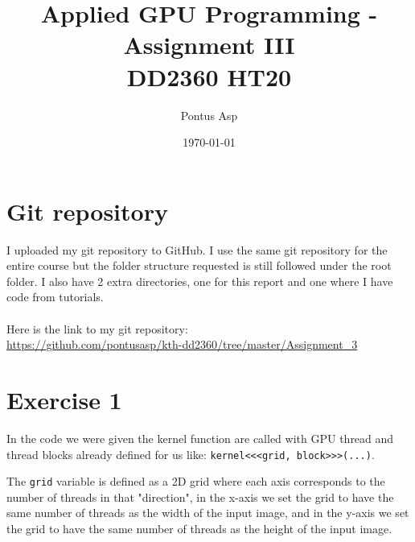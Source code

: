 \documentclass[a4paper, 12pt]{article}
\def\code#1{\texttt{#1}}
\begin{document}
\title{\vspace{4.0cm}Applied GPU Programming - Assignment III\\
\large DD2360 HT20}
\author{Pontus Asp}
\date{\today}
\maketitle
\thispagestyle{empty}
\newpage

\clearpage
{}

\section{Git repository}
I uploaded my git repository to GitHub. I use the same git repository for the entire course but the folder structure requested is still followed under the root folder. I also have 2 extra directories, one for this report and one where I have code from tutorials.
\\\\
Here is the link to my git repository:\\
\url{https://github.com/pontusasp/kth-dd2360/tree/master/Assignment_3}





\section{Exercise 1}
In the code we were given the kernel function are called with GPU thread and thread blocks already defined for us like: \code{kernel<<<grid, block>>>(...)}. 

The \code{grid} variable is defined as a 2D grid where each axis corresponds to the number of threads in that "direction", in the x-axis we set the grid to have the same number of threads as the width of the input image, and in the y-axis we set the grid to have the same number of threads as the height of the input image.
\end{document}
